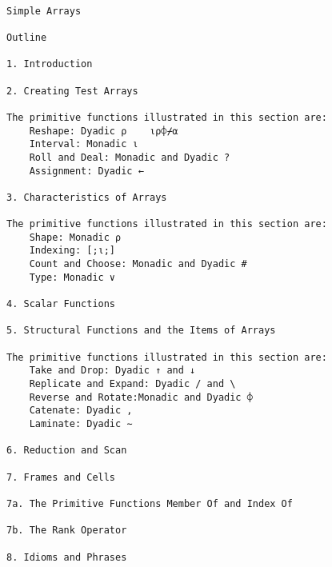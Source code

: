 \documentclass{article}
\begin{document}
\begin{verbatim}




Simple Arrays  

Outline                                                               

1. Introduction                                                       

2. Creating Test Arrays                                               

The primitive functions illustrated in this section are:              
	Reshape: Dyadic ⍴    ⍳⍴⌽⌿⍺                                                 
	Interval: Monadic ⍳                                                   
	Roll and Deal: Monadic and Dyadic ?                                   
	Assignment: Dyadic ←                                                  

3. Characteristics of Arrays                                          

The primitive functions illustrated in this section are:              
	Shape: Monadic ⍴                                                     
	Indexing: [;⍳;]                                                       
	Count and Choose: Monadic and Dyadic #                                
	Type: Monadic ∨                                                       

4. Scalar Functions                                                   

5. Structural Functions and the Items of Arrays                       

The primitive functions illustrated in this section are:              
	Take and Drop: Dyadic ↑ and ↓                                         
	Replicate and Expand: Dyadic / and \                                  
	Reverse and Rotate:Monadic and Dyadic ⌽                               
	Catenate: Dyadic ,                                                    
	Laminate: Dyadic ∼                                                    

6. Reduction and Scan                                                 

7. Frames and Cells                                                   

7a. The Primitive Functions Member Of and Index Of                    

7b. The Rank Operator                                                 

8. Idioms and Phrases                                                 


\end{verbatim}
\end{document}
